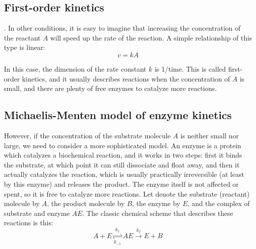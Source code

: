 \documentclass[
  letterpaper,
  DIV=11,
  numbers=noendperiod]{scrreprt}
\begin{document}
\hypertarget{first-order-kinetics}{%
\subsection{First-order kinetics}\label{first-order-kinetics}}

. In other conditions, it is easy to imagine
that increasing the concentration of the reactant \(A\) will speed up
the rate of the reaction. A simple relationship of this type is linear:
\begin{equation}
v = kA
\label{eq:kinetics_1st_order}
\end{equation}

In this case, the dimension of the rate constant \(k\) is 1/time. This
is called first-order kinetics, and it usually describes reactions when
the concentration of \(A\) is small, and there are plenty of free
enzymes to catalyze more reactions.

\hypertarget{michaelis-menten-model-of-enzyme-kinetics}{%
\subsection{\texorpdfstring{Michaelis-Menten model of enzyme kinetics
}{Michaelis-Menten model of enzyme kinetics }}\label{michaelis-menten-model-of-enzyme-kinetics}}

However, if the concentration of the substrate molecule \(A\) is neither
small nor large, we need to consider a more sophisticated model. An
enzyme is a protein which catalyzes a biochemical reaction, and it works
in two steps: first it binds the substrate, at which point it can still
dissociate and float away, and then it actually catalyzes the reaction,
which is usually practically irreversible (at least by this enzyme) and
releases the product. The enzyme itself is not affected or spent, so it
is free to catalyze more reactions. Let denote the substrate (reactant)
molecule by \(A\), the product molecule by \(B\), the enzyme by \(E\),
and the complex of substrate and enzyme \(AE\). The classic chemical
scheme that describes these reactions is this: \[
A + E \underset{k_{-1}}{\overset{k_1}{\rightleftharpoons}} AE  \xrightarrow{k_2} E + B
\]
\end{document}
